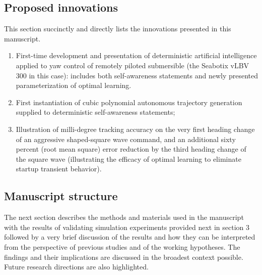 \documentclass[applsci,article,submit,pdftex,moreauthors]{Definitions/mdpi}
\begin{document}
\subsection{Proposed innovations} 

This section succinctly and directly lists the innovations presented in this manuscript.

\begin{enumerate}
\item	First-time development and presentation of deterministic artificial intelligence applied to yaw control of remotely piloted submersible (the Seabotix vLBV 300 in this case): includes both self-awareness statements and newly presented parameterization of optimal learning. 
\item	First instantiation of cubic polynomial autonomous trajectory generation supplied to deterministic self-awareness statements;
\item	Illustration of milli-degree tracking accuracy on the very first heading change of an aggressive shaped-square wave command, and an additional sixty percent (root mean square) error reduction by the third heading change of the square wave (illustrating the efficacy of optimal learning to eliminate startup transient behavior).
\end{enumerate}

\subsection{Manuscript structure} 
The next section describes the methods and materials used in the manuscript with the results of validating simulation experiments provided next in section 3 followed by a very brief discussion of the results and how they can be interpreted from the perspective of previous studies and of the working hypotheses. The findings and their implications are discussed in the broadest context possible. Future research directions are also highlighted.

\end{document}
